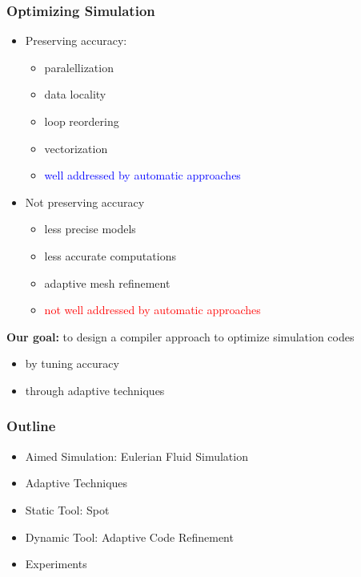 \documentclass{beamer}\usetheme{Madrid} %
\begin{document}
\begin{frame}
    \frametitle{Optimizing Simulation}
    \begin{itemize}
				\item 
					Preserving accuracy:
					\begin{itemize}
						\item
							paralellization
						\item
							data locality
						\item
							loop reordering
						\item
							vectorization
						\item
							\textcolor{blue}{well addressed by automatic approaches}
						\end{itemize}
				\item
					Not preserving accuracy
						\begin{itemize}
						\item 
							less precise models
						\item
							less accurate computations
						\item
							adaptive mesh refinement
						\item
							\textcolor{red}{not well addressed by automatic approaches}
						\end{itemize}				
    \end{itemize}
    \textbf{Our goal:} to design a compiler approach to optimize simulation codes
    \begin{itemize}
		\item
			by tuning accuracy
		\item
			through adaptive techniques
		\end{itemize}
\end{frame}
\begin{frame}
    \frametitle{Outline} 
    \begin{itemize}
		\item
			Aimed Simulation: Eulerian Fluid Simulation
        \item
            Adaptive Techniques
        \item
            Static Tool: Spot
        \item
            Dynamic Tool: Adaptive Code Refinement
        \item
            Experiments
    \end{itemize}
\end{frame}
\end{document}
